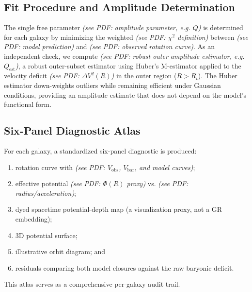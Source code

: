 \subsection{Fit Procedure and Amplitude Determination}
The single free parameter \emph{(see PDF: amplitude parameter, e.g. $Q$)} is determined for each galaxy by minimizing the weighted \emph{(see PDF: $\chi^2$ definition)} between \emph{(see PDF: model prediction)} and \emph{(see PDF: observed rotation curve)}. As an independent check, we compute \emph{(see PDF: robust outer amplitude estimator, e.g. $Q_{\mathrm{est}}$)}, a robust outer-subset estimator using Huber's M-estimator applied to the velocity deficit \emph{(see PDF: $\Delta V^2(R)$)} in the outer region ($R > R_t$). The Huber estimator down-weights outliers while remaining efficient under Gaussian conditions, providing an amplitude estimate that does not depend on the model's functional form.

\subsection{Six-Panel Diagnostic Atlas}
For each galaxy, a standardized six-panel diagnostic is produced:

\begin{enumerate}
\item rotation curve with \emph{(see PDF: $V_{\mathrm{obs}}$, $V_{\mathrm{bar}}$, and model curves)};
\item effective potential \emph{(see PDF: $\Phi(R)$ proxy)} vs. \emph{(see PDF: radius/acceleration)};
\item dyed spacetime potential-depth map (a visualization proxy, not a GR embedding);
\item 3D potential surface;
\item illustrative orbit diagram; and
\item residuals comparing both model closures against the raw baryonic deficit.
\end{enumerate}

This atlas serves as a comprehensive per-galaxy audit trail.
